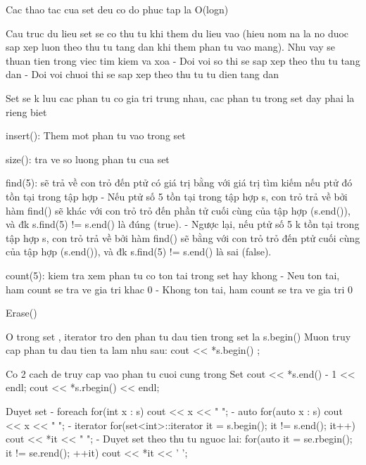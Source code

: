     Cac thao tac cua set deu co do phuc tap la O(logn)

    Cau truc du lieu set se co thu tu khi them du lieu vao (hieu nom na la no duoc sap xep luon theo thu tu tang dan khi them phan tu vao mang). Nhu vay se thuan tien trong viec tim kiem va xoa
        - Doi voi so thi se sap xep theo thu tu tang dan
        - Doi voi chuoi thi se sap xep theo thu tu tu dien tang dan

    Set se k luu cac phan tu co gia tri trung nhau, cac phan tu trong set day phai la rieng biet

    insert(): Them mot phan tu vao trong set

    size(): tra ve so luong phan tu cua set

    find(5): sẽ trả về con trỏ đến ptử có giá trị bằng với giá trị tìm kiếm nếu ptử đó tồn tại trong tập hợp
        - Nếu ptử số 5 tồn tại trong tập hợp s, con trỏ trả về bởi hàm find() sẽ khác với con trỏ trỏ đến phần tử cuối cùng của tập hợp (s.end()), và đk s.find(5) != s.end() là đúng (true).
        - Ngược lại, nếu ptử số 5 k tồn tại trong tập hợp s, con trỏ trả về bởi hàm find() sẽ bằng với con trỏ trỏ đến ptử cuối cùng của tập hợp (s.end()), và đk s.find(5) != s.end() là sai (false). 

    count(5): kiem tra xem phan tu co ton tai trong set hay khong
        - Neu ton tai, ham count se tra ve gia tri khac 0
        - Khong ton tai, ham count se tra ve gia tri 0

    Erase()

    O trong set , iterator tro den phan tu dau tien trong set la s.begin()
    Muon truy cap phan tu dau tien ta lam nhu sau: 
        cout << *s.begin() ;
    
    Co 2 cach de truy cap vao phan tu cuoi cung trong Set
        cout << *s.end() - 1 << endl;
        cout << *s.rbegin() << endl;

    Duyet set
        - foreach
            for(int x : s){
                cout << x << " ";
            }
        - auto
            for(auto x : s){
                cout << x << " ";
            }
        - iterator
            for(set<int>::iterator it = s.begin(); it != s.end(); it++){
                cout << *it << " ";
            }
        - Duyet set theo thu tu nguoc lai:
             for(auto it = se.rbegin(); it != se.rend(); ++it)
                cout << *it << ' ';
